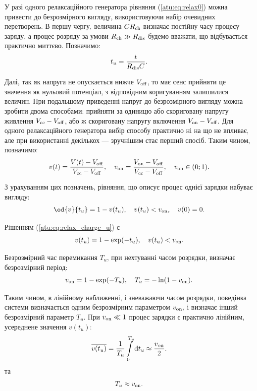 У разі одного релаксаційного генератора рівняння (\ref{atu:eq:relax0})
можна привести до безрозмірного вигляду, використовуючи набір
очевидних перетворень. В першу чергу, величина
$C R _\mathrm{ch} $ визначає постійну часу процесу заряду, а процес
розряду за умови
$R _\mathrm{ch} \gg R _\mathrm{dis} $ будемо вважати, що відбувається практично
миттєво. Позначимо:
%
\begin{equation}
  t_u = \frac{t}{R_\mathrm{dis} C} .
  \label{atu:eq:t_u_relax}
\end{equation}

Далі, так як напруга не опускається нижче
$V_\mathrm{off} $, то має сенс прийняти це значення як нульовий потенціал,
з відповідним коригуванням залишилися величин. При подальшому
приведенні напруг до безрозмірного вигляду можна зробити двома
способами: прийняти за одиницю або скориговану напругу живлення
$V_\mathrm{cc} -V _\mathrm{off} $, або ж скориговану напругу включення
$V_\mathrm{on} -V _\mathrm{off} $. Для одного релаксаційного генератора вибір
способу практично ні на що не впливає, але при використанні
декількох --- зручнішим стає перший спосіб. Таким чином,
позначимо:
%
\begin{equation}
  v(t) = \frac{V(t)-V_\mathrm{off}}{V_\mathrm{cc}-V_\mathrm{off}},
  \quad
  v_\mathrm{on} = \frac{V_\mathrm{on}-V_\mathrm{off}}{V_\mathrm{cc}-V_\mathrm{off}},
  \quad
  v_\mathrm{on} \in ( 0; 1 ).
  \label{atu:eq:v_u_relax}
\end{equation}

З урахуванням цих позначень, рівняння, що описує процес однієї
зарядки набуває вигляду:
%
\begin{equation}
  \od{v}{t_u} = 1 - v( t_u ),
  \quad
  v( t_u ) < v\Tidx{on},
  \quad
  v(0) = 0.
  \label{atu:eq:relax_charge_u}
\end{equation}

Рішенням (\ref{atu:eq:relax_charge_u}) є
%
\begin{equation}
  v(t_u) = 1 - \exp( - t_u ) ,
  \quad
  v( t_u ) < v_\mathrm{on}.
  \label{atu:eq:relax_charge_u_solu}
\end{equation}

Безрозмірний час перемикання
$T_u $, при нехтуванні часом розрядки, визначає безрозмірний
період:
%
\begin{equation}
  v_\mathrm{on} = 1 - \exp( - T_u ),
  \quad
  T_u = - \ln ( 1 - v_\mathrm{on} ).
  \label{atu:eq:T_u_relax}
\end{equation}

Таким чином, в лінійному наближенні, і зневажаючи часом
розрядки, поведінка системи визначається одним безрозмірним
параметром
$v _\mathrm{on} $, і визначає інший безрозмірний параметр
$T_u $. При
$v _\mathrm{on} \ll 1 $ процес зарядки є практично лінійним, усереднене значення
$v(t_u) $:
%
\begin{equation}
  \overline{v(t_u)} =
  \frac{1}{T_u}\int\limits_{0}^{T_u} \mathrm{d}t_u
  \approx
  \frac{v_\mathrm{on}}{ 2 }.
  \label{atu:eq:av_lin_relax}
\end{equation}
%
та
%
\begin{equation}
  T_u
  \approx
  v_\mathrm{on}.
  \label{atu:eq:T_u_lin_relax}
\end{equation}

